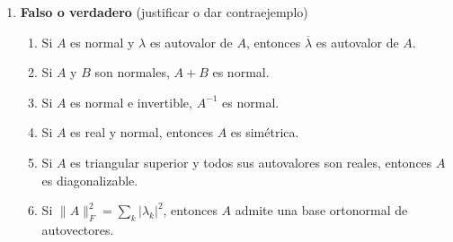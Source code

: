 \begin{enumerate}
\item {\bf Falso o verdadero} (justificar o dar contraejemplo)   %
\begin{enumerate}[label=\alph*)]
    \item Si $A$ es normal y $\lambda$ es autovalor de $A$, entonces $\overline{\lambda}$
          es autovalor de $A$.
    \item Si $A$ y $B$ son normales, $A+B$ es normal.
    \item Si $A$ es normal e invertible, $A^{-1}$ es normal.
    \item Si $A$ es real y normal, entonces $A$ es simétrica.
    \item Si $A$ es triangular superior y todos sus autovalores son reales, entonces
          $A$ es diagonalizable.
    \item Si $\|A\|_F^{2}=\sum_k|\lambda_k|^{2}$, entonces $A$ admite una base
          ortonormal de autovectores.
\end{enumerate}

\end{enumerate}